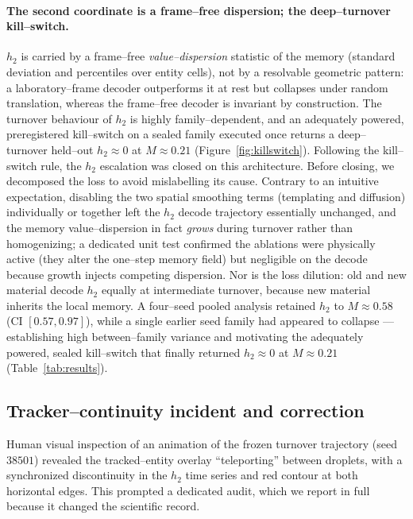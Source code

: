 \documentclass[11pt]{article}
\begin{document}
\paragraph{The second coordinate is a frame--free dispersion; the deep--turnover kill--switch.} $h_2$ is carried by
a frame--free \emph{value--dispersion} statistic of the memory (standard deviation and percentiles over entity
cells), not by a resolvable geometric pattern: a laboratory--frame decoder outperforms it at rest but collapses
under random translation, whereas the frame--free decoder is invariant by construction. The turnover behaviour of
$h_2$ is highly family--dependent, and an adequately powered, preregistered kill--switch on a sealed family executed
once returns a deep--turnover held--out $h_2\approx0$ at $M\approx0.21$ (Figure~\ref{fig:killswitch}). Following the
kill--switch rule, the $h_2$ escalation was closed on this architecture. Before closing, we decomposed the loss to avoid mislabelling its cause. Contrary to an intuitive expectation, disabling the two spatial smoothing terms (templating and diffusion) individually or together left the $h_2$ decode trajectory essentially unchanged, and the memory value--dispersion in fact \emph{grows} during turnover rather than homogenizing; a dedicated unit test confirmed the ablations were physically active (they alter the one--step memory field) but negligible on the decode because growth injects competing dispersion. Nor is the loss dilution: old and new material decode $h_2$ equally at intermediate turnover, because new material inherits the local memory. A four--seed pooled analysis retained $h_2$ to $M\approx0.58$ (CI $[0.57,0.97]$), while a single earlier seed family had appeared to collapse --- establishing high between--family variance and motivating the adequately powered, sealed kill--switch that finally returned $h_2\approx0$ at $M\approx0.21$ (Table~\ref{tab:results}).

\subsection{Tracker--continuity incident and correction}
\label{sec:tracker}
Human visual inspection of an animation of the frozen turnover trajectory (seed $38501$) revealed the
tracked--entity overlay ``teleporting'' between droplets, with a synchronized discontinuity in the $h_2$
time series and red contour at both horizontal edges. This prompted a dedicated audit, which we report in full
because it changed the scientific record.
\end{document}
